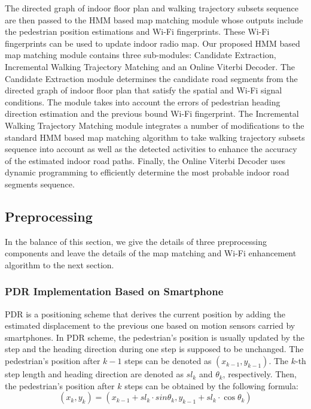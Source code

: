 \documentclass[conference]{IEEEtran}
\begin{document}
The directed graph of indoor floor plan and walking trajectory subsets sequence are then passed to the HMM based map matching module whose outputs include the pedestrian position estimations and Wi-Fi fingerprints. These Wi-Fi fingerprints can be used to update indoor radio map. Our proposed HMM based map matching module contains three sub-modules: Candidate Extraction, Incremental Walking Trajectory Matching and an Online Viterbi Decoder. The Candidate Extraction module determines the candidate road segments from the directed graph of indoor floor plan that satisfy the spatial and Wi-Fi signal conditions. The module takes into account the errors of pedestrian heading direction estimation and the previous bound Wi-Fi fingerprint. The Incremental Walking Trajectory Matching module integrates a number of modifications to the standard HMM based map matching algorithm to take walking trajectory subsets sequence into account as well as the detected activities to enhance the accuracy of the estimated indoor road paths. Finally, the Online Viterbi Decoder uses dynamic programming to efficiently determine the most probable indoor road segments sequence.

\subsection{Preprocessing}

In the balance of this section, we give the details of three preprocessing components and leave the details of the map matching and Wi-Fi enhancement algorithm to the next section.

\subsubsection{PDR Implementation Based on Smartphone}

PDR is a positioning scheme that derives the current position by adding the estimated displacement to the previous one based on motion sensors carried by smartphones. In PDR scheme, the pedestrian's position is usually updated by the step and the heading direction during one step is supposed to be unchanged. The pedestrian's position after $k-1$ steps can be denoted as $(x_{k-1},y_{k-1})$. The $k$-th step length and heading direction are denoted as $sl_k$ and $\theta_k$, respectively. Then, the pedestrian's position after $k$ steps can be obtained by the following formula:
\begin{equation}
	\label{equ_pdr}
	({x_k},{y_k}) = ({x_{k - 1}} + s{l_k} \cdot sin{\theta _k},{y_{k - 1}} + s{l_k} \cdot \cos {\theta _k})
\end{equation}
\end{document}
